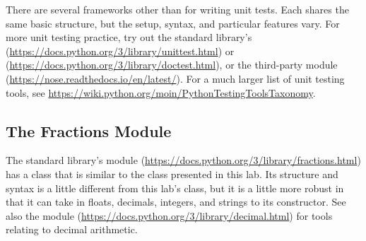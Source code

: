 There are several frameworks other than  for writing unit tests.
Each shares the same basic structure, but the setup, syntax, and particular features vary.
For more unit testing practice, try out the standard library's  (\url{https://docs.python.org/3/library/unittest.html}) or  (\url{https://docs.python.org/3/library/doctest.html}), or the third-party  module (\url{https://nose.readthedocs.io/en/latest/}).
For a much larger list of unit testing tools, see \url{https://wiki.python.org/moin/PythonTestingToolsTaxonomy}.

\subsection*{The Fractions Module} %

The standard library's  module (\url{https://docs.python.org/3/library/fractions.html}) has a  class that is similar to the  class presented in this lab.
Its structure and syntax is a little different from this lab's class, but it is a little more robust in that it can take in floats, decimals, integers, and strings to its constructor.
See also the  module (\url{https://docs.python.org/3/library/decimal.html}) for tools relating to decimal arithmetic.
